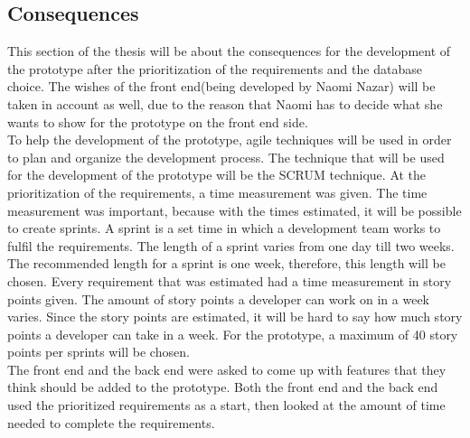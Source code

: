 \documentclass[paper=a4, fontsize=11pt,twoside]{scrartcl}	%
\begin{document}
\newpage
\subsection{Consequences}
This section of the thesis will be about the consequences for the development of the prototype after the prioritization of the requirements and the database choice. The wishes of the front end(being developed by Naomi Nazar) will be taken in account as well, due to the reason that Naomi has to decide what she wants to show for the prototype on the front end side. \\
To help the development of the prototype, agile techniques will be used in order to plan and organize the development process. The technique that will be used for the development of the prototype will be the SCRUM technique. At the prioritization of the requirements, a time measurement was given. The time measurement was important, because with the times estimated, it will be possible to create sprints. A sprint is a set time in which a development team works to fulfil the requirements. The length of a sprint varies from one day till two weeks. The recommended length for a sprint is one week, therefore, this length will be chosen. Every requirement that was estimated had a time measurement in story points given. The amount of story points a developer can work on in a week varies. Since the story points are estimated, it will be hard to say how much story points a developer can take in a week. For the prototype, a maximum of 40 story points per sprints will be chosen. \\
The front end and the back end were asked to come up with features that they think should be added to the prototype. Both the front end and the back end used the prioritized requirements as a start, then looked at the amount of time needed to complete the requirements. 



\newpage
\end{document}
